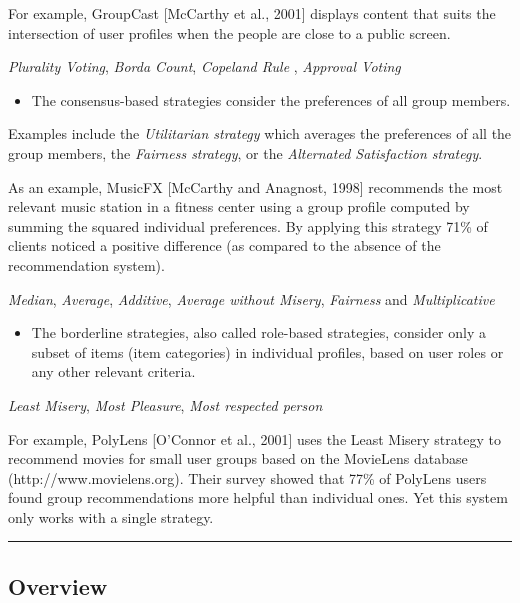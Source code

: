 \documentclass[]{article}
\begin{document}
For example, GroupCast {[}McCarthy et al., 2001{]} displays content that
suits the intersection of user profiles when the people are close to a
public screen.

\emph{Plurality Voting}, \emph{Borda Count}, \emph{Copeland Rule} ,
\emph{Approval Voting}

\begin{itemize}
\item
  The consensus-based strategies consider the preferences of all group
  members.
\end{itemize}

Examples include the \emph{Utilitarian strategy} which averages the
preferences of all the group members, the \emph{Fairness strategy}, or
the \emph{Alternated Satisfaction strategy}.

As an example, MusicFX {[}McCarthy and Anagnost, 1998{]} recommends the
most relevant music station in a fitness center using a group profile
computed by summing the squared individual preferences. By applying this
strategy 71\% of clients noticed a positive difference (as compared to
the absence of the recommendation system).

\emph{Median}, \emph{Average}, \emph{Additive}, \emph{Average without
Misery}, \emph{Fairness} and \emph{Multiplicative}

\begin{itemize}
\item
  The borderline strategies, also called role-based strategies, consider
  only a subset of items (item categories) in individual profiles, based
  on user roles or any other relevant criteria.
\end{itemize}

\emph{Least Misery}, \emph{Most Pleasure}, \emph{Most respected person}

For example, PolyLens {[}O'Connor et al., 2001{]} uses the Least Misery
strategy to recommend movies for small user groups based on the
MovieLens database (http://www.movielens.org). Their survey showed that
77\% of PolyLens users found group recommendations more helpful than
individual ones. Yet this system only works with a single strategy.

\begin{center}\rule{3in}{0.4pt}\end{center}

\subsection{Overview}
\end{document}
